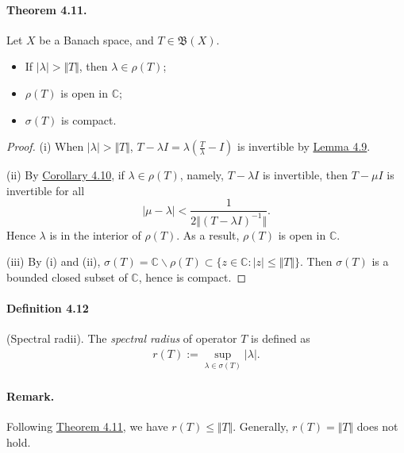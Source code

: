 \documentclass{article}
\begin{document}
\paragraph{Theorem 4.11.\label{thm:4.11}} Let $X$ be a Banach space, and $T\in\mathfrak{B}(X)$. 
\begin{itemize}
	\vspace{0.1cm}
	\item[(i)] If $\vert\lambda\vert>\Vert T\Vert$, then $\lambda\in\rho(T)$;
	\vspace{0.1cm} 
	\item[(ii)] $\rho(T)$ is open in $\mathbb{C}$; 
	\vspace{0.1cm}
	\item[(iii)] $\sigma(T)$ is compact.
\end{itemize}
\begin{proof}
(i) When $\vert\lambda\vert>\Vert T\Vert$, $T-\lambda I= \lambda\left(\frac{T}{\lambda} - I\right)$ is invertible by \hyperref[lemma:4.9]{Lemma 4.9}. \vspace{0.1cm}

(ii) By \hyperref[cor:4.10]{Corollary 4.10}, if $\lambda\in\rho(T)$, namely, $T-\lambda I$ is invertible, then $T-\mu I$ is invertible for all $$\vert\mu-\lambda\vert < \frac{1}{2\Vert (T-\lambda I)^{-1}\Vert}.$$
Hence $\lambda$ is in the interior of $\rho(T)$. As a result, $\rho(T)$ is open in $\mathbb{C}$.\vspace{0.1cm}

(iii) By (i) and (ii), $\sigma(T) = \mathbb{C}\backslash\rho(T)\subset\{z\in\mathbb{C}:\vert z\vert\leq\Vert T\Vert\}$. Then $\sigma(T)$ is a bounded closed subset of $\mathbb{C}$, hence is compact.
\end{proof}

\paragraph{Definition 4.12\label{def:4.12}} (Spectral radii). The \textit{spectral radius} of operator $T$ is defined as
\begin{align*}
	r(T) := \sup_{\lambda\in\sigma(T)} \vert\lambda\vert.
\end{align*}
\paragraph{Remark.} Following \hyperref[thm:4.11]{Theorem 4.11}, we have $r(T)\leq\Vert T\Vert$. Generally, $r(T)=\Vert T\Vert$ does not hold.
\end{document}
